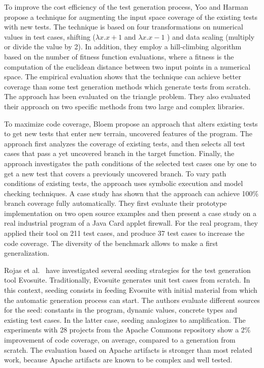 To improve the cost efficiency of the test generation process, Yoo and Harman \cite{yoo2012} propose a technique for augmenting the input space coverage of the existing tests with new tests. 
The technique is based on four transformations on numerical values in test cases, \ie shifting ($\lambda x.x+1$ and  $\lambda x.x-1$ ) and data scaling (multiply or divide the value by 2).
In addition, they employ a hill-climbing algorithm based on the number of fitness function evaluations, where a fitness is the computation of the euclidean distance between two input points in a numerical space. 
The empirical evaluation shows that the technique can achieve better coverage than some test generation methods which generate tests from scratch.
The approach has been evaluated  on the triangle problem.
They also evaluated their approach on two specific methods from two large and complex libraries.

To maximize code coverage, Bloem \etal \cite{6958388} propose an approach that alters existing tests to get new tests that enter new terrain, \ie uncovered features of the program.
The approach first analyzes the coverage of existing tests, and then selects all test cases that pass a yet uncovered branch in the target function.
Finally, the approach investigates the path conditions of the selected test cases one by one to get a new test that covers a previously uncovered branch. 
To vary path conditions of existing tests, the approach uses symbolic execution and model checking techniques. 
A case study has shown that the approach can achieve 100\% branch coverage fully automatically.
They first evaluate their prototype implementation on two open source examples and then present a case study on a real industrial program of a Java Card applet firewall.
For the real program, they applied their tool on 211 test cases, and produce 37 test cases to increase the code coverage.
The diversity of the benchmark allows to make a first generalization.

Rojas et al.~\cite{rojas2016seeding} have investigated several seeding strategies for the test generation tool Evosuite. 
Traditionally, Evosuite generates unit test cases from scratch.
In this context, seeding consists in feeding Evosuite with initial material from which the automatic generation process can start. 
The authors evaluate different sources for the seed: constants in the program, dynamic values, concrete types and existing test cases. 
In the latter case, seeding analogizes to amplification. 
The experiments with 28 projects from the Apache Commons repository show a 2\% improvement of code coverage, on average, compared to a generation from scratch.
The evaluation based on Apache artifacts is stronger than most related work, because Apache artifacts are known to be complex and well tested.

